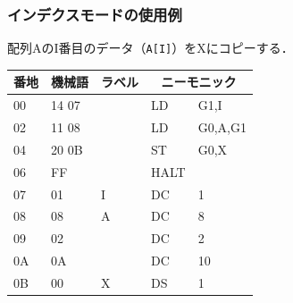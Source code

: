 \documentclass[handout]{beamer}        %
\begin{document}
\begin{frame}
  \frametitle{インデクスモードの使用例}
  配列AのI番目のデータ（\texttt{A[I]}）をXにコピーする．
  \vfill
  \begin{minipage}[]{0.58\columnwidth}
  {\small\ttfamily\begin{center}
    \begin{tabular}{|l|l|l|l l|} \hline
      {\footnotesize 番地} & {\footnotesize 機械語} &
      {\footnotesize ラベル} & \multicolumn{2}{|c|}{ニーモニック} \\
      \hline
      00 & 14 07 &   & LD   & G1,I          \\
      02 & 11 08 &   & LD   & G0,A,G1       \\
      04 & 20 0B &   & ST   & G0,X          \\
      06 & FF    &   & HALT &               \\
      07 & 01    & I & DC   & 1             \\
      08 & 08    & A & DC   & 8             \\
      09 & 02    &   & DC   & 2             \\
      0A & 0A    &   & DC   & 10            \\
      0B & 00    & X & DS   & 1             \\
      \hline
    \end{tabular}
  \end{center}}
  \end{minipage}
  \begin{minipage}[b]{0.38\columnwidth}
    \vspace{1.3cm}
  \end{minipage}
  \vfill
\end{frame}
\end{document}
